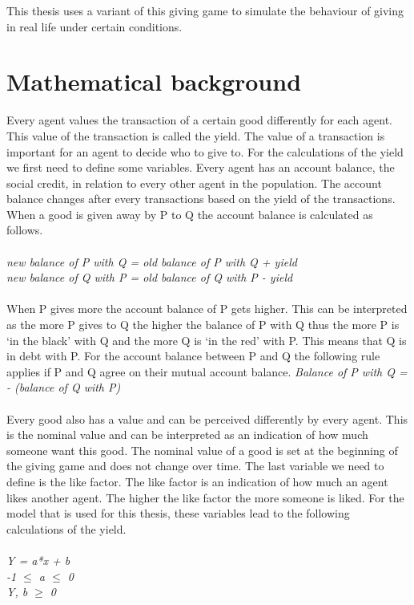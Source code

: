 \documentclass[twoside,openright]{uva-bachelor-thesis}
\begin{document}
This thesis uses a variant of this giving game to simulate the behaviour of giving in real life under certain conditions.

\section{Mathematical background}
Every agent values the transaction of a certain good differently for each agent. This value of the transaction is called the yield. The value of a transaction is important for an agent to decide who to give to. For the calculations of the yield we first need to define some variables. Every agent has an account balance, the social credit, in relation to every other agent in the population. The account balance changes after every transactions based on the yield of the transactions. When a good is given away by P to Q the account balance is calculated as follows.\\
\\
\textit{new balance of P with Q = old balance of P with Q + yield} \\
\textit{new balance of Q with P = old balance of Q with P - yield} \\
\\
When P gives more the account balance of P gets higher. This can be interpreted as the more P gives to Q the higher the balance of P with Q thus the more P is ‘in the black’ with Q and the more Q is ‘in the red’ with P. This means that Q is in debt with P. 
For the account balance between P and Q the following rule applies if P and Q agree on their mutual account balance.
\textit{Balance of P with Q = - (balance of Q with P)}
\\
\\
Every good also has a value and can be perceived differently by every agent. This is the nominal value and can be interpreted as an indication of how much someone want this good. The nominal value of a good is set at the beginning of the giving game and does not change over time. The last variable we need to define is the like factor. The like factor is an indication of how much an agent likes another agent. The higher the like factor the more someone is liked.
For the model that is used for this thesis, these variables lead to the following calculations of the yield.
\\
\\
\textit{Y = a*x + b} \\
\textit{-1 $\le$ a $\le$ 0} \\
\textit{Y, b $\ge$ 0} \\
\end{document}
